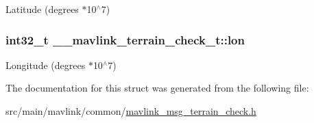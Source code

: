 Latitude (degrees $\ast$10$^\wedge$7) 

\hypertarget{struct____mavlink__terrain__check__t_a97eba74960ff652d08651dedfadd43ea}{
\subsubsection[{lon}]{\setlength{\rightskip}{0pt plus 5cm}int32\+\_\+t \+\_\+\+\_\+mavlink\+\_\+terrain\+\_\+check\+\_\+t\+::lon}}\label{struct____mavlink__terrain__check__t_a97eba74960ff652d08651dedfadd43ea}


Longitude (degrees $\ast$10$^\wedge$7) 



The documentation for this struct was generated from the following file\+:\begin{DoxyCompactItemize}
\item 
src/main/mavlink/common/\hyperlink{mavlink__msg__terrain__check_8h}{mavlink\+\_\+msg\+\_\+terrain\+\_\+check.\+h}\end{DoxyCompactItemize}
